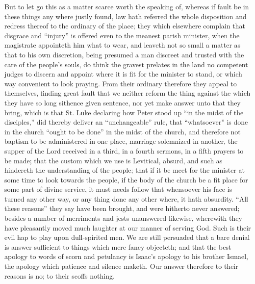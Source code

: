 But to let go this as a matter scarce worth the speaking of, whereas if fault be in these things any where justly found, law hath referred the whole disposition and redress thereof to the ordinary of the place; they which elsewhere complain that disgrace and “injury” is offered even to the meanest parish minister, when the magistrate appointeth him what to wear, and leaveth not so small a matter as that to his own discretion, being presumed a man discreet and trusted with the care of the people’s souls, do think the gravest prelates in the land no competent judges to discern and appoint where it is fit for the minister to stand, or which way convenient to look praying. From their ordinary therefore they appeal  to themselves, finding great fault that we neither reform the thing against the which they have so long sithence given sentence, nor yet make answer unto that they bring, which is that St. Luke declaring how Peter stood up “in the midst of the disciples,” did thereby deliver an “unchangeable” rule, that “whatsoever” is done in the church “ought to be  done” in the midst of the church, and therefore not baptism to be administered in one place, marriage solemnized in another, the supper of the Lord received in a third, in a fourth sermons, in a fifth prayers to be made; that the custom which we use is Levitical, absurd, and such as hindereth the understanding of the people; that if it be meet for the minister at some time to look towards the people, if the body of the church be a fit place for some part of divine service, it must needs follow that whensoever his face is turned any other way, or any thing done any other where, it hath absurdity. “All these reasons” they say have been brought, and were hitherto never answered; besides a number of merriments and jests unanswered likewise, wherewith they have pleasantly moved much laughter at our manner of serving God. Such is their evil hap to play upon dull-spirited men. We are still persuaded that a bare denial is answer sufficient to things which mere fancy objecteth; and that the best apology to words of scorn and petulancy is Isaac’s apology to his brother Ismael, the apology which patience and silence maketh. Our answer therefore to their reasons is no; to their scoffs nothing.

